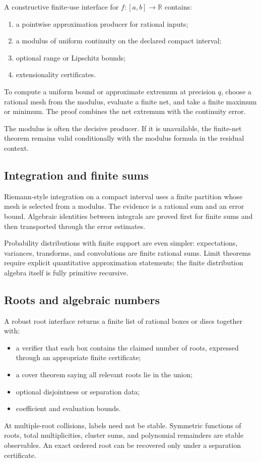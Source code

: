 A constructive finite-use interface for \(f:[a,b]\to\mathbb R\) contains:
\begin{enumerate}
\item a pointwise approximation producer for rational inputs;
\item a modulus of uniform continuity on the declared compact interval;
\item optional range or Lipschitz bounds;
\item extensionality certificates.
\end{enumerate}
To compute a uniform bound or approximate extremum at precision \(q\), choose a rational mesh from the modulus, evaluate a finite net, and take a finite maximum or minimum.  The proof combines the net extremum with the continuity error.

The modulus is often the decisive producer.  If it is unavailable, the finite-net theorem remains valid conditionally with the modulus formula in the residual context.

\subsection{Integration and finite sums}

Riemann-style integration on a compact interval uses a finite partition whose mesh is selected from a modulus.  The evidence is a rational sum and an error bound.  Algebraic identities between integrals are proved first for finite sums and then transported through the error estimates.

Probability distributions with finite support are even simpler: expectations, variances, transforms, and convolutions are finite rational sums.  Limit theorems require explicit quantitative approximation statements; the finite distribution algebra itself is fully primitive recursive.

\subsection{Roots and algebraic numbers}

A robust root interface returns a finite list of rational boxes or discs together with:
\begin{itemize}
\item a verifier that each box contains the claimed number of roots, expressed through an appropriate finite certificate;
\item a cover theorem saying all relevant roots lie in the union;
\item optional disjointness or separation data;
\item coefficient and evaluation bounds.
\end{itemize}
At multiple-root collisions, labels need not be stable.  Symmetric functions of roots, total multiplicities, cluster sums, and polynomial remainders are stable observables.  An exact ordered root can be recovered only under a separation certificate.


